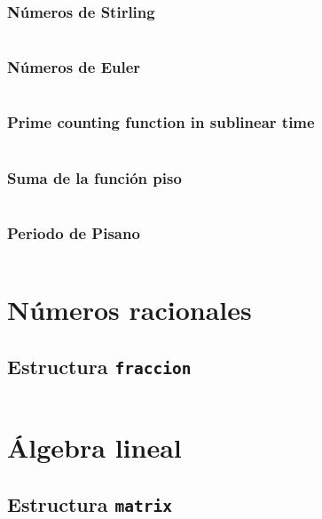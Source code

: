 \documentclass[11pt]{article}
\begin{document}
			\subsubsection{Números de Stirling}
			\inputminted[tabsize=2,breaklines,firstline=967,lastline=988,fontsize=\small]{c++}{numberTheory.cpp}
			
			\subsubsection{Números de Euler}
			\inputminted[tabsize=2,breaklines,firstline=990,lastline=1001,fontsize=\small]{c++}{numberTheory.cpp}
			
			\subsubsection{Prime counting function in sublinear time}
			\inputminted[tabsize=2,breaklines,firstline=27,lastline=77,fontsize=\small]{c++}{pi.cpp}
			
			\subsubsection{Suma de la función piso}
			\inputminted[tabsize=2,breaklines,firstline=1003,lastline=1022,fontsize=\small]{c++}{numberTheory.cpp}
			
			\subsubsection{Periodo de Pisano}
			\inputminted[tabsize=2,breaklines,firstline=1049,lastline=1076,fontsize=\small]{c++}{numberTheory.cpp}
			
	\newpage
	\section{Números racionales}
		\subsection{Estructura \texttt{fraccion}}
		\inputminted[tabsize=2,breaklines,firstline=7,lastline=123,fontsize=\small]{c++}{fraccion.cpp}
		
	\newpage
	\section{Álgebra lineal}
		\subsection{Estructura \texttt{matrix}}
		\inputminted[tabsize=2,breaklines,firstline=7,lastline=130,fontsize=\small]{c++}{matrix.cpp}
		
\end{document}
